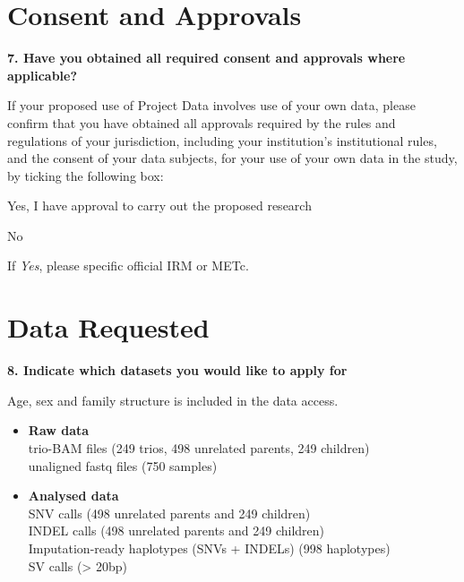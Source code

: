 \documentclass[a4paper,12pt]{article}
\begin{document}
\begin{Form}
\TextField[name=studyDescription,multiline=true,height=30\baselineskip]{}

\section*{Consent and Approvals}

\textbf{7. Have you obtained all required consent and approvals where applicable?}

If your proposed use of Project Data involves use of your own data, please confirm that you have obtained all approvals required by the rules and regulations of your jurisdiction, including your institution’s institutional rules, and the consent of your data subjects, for your use of your own data in the study, by ticking the following box:

 Yes, I have approval to carry out the proposed research

 No

If \emph{Yes}, please specific official IRM or METc.

\TextField[name=consentApproval,multiline=true,height=6\baselineskip]{}

\section*{Data Requested}

\textbf{8. Indicate which datasets you would like to apply for}

Age, sex and family structure is included in the data access.
\begin{itemize}
  \item[] \CheckBox[name=testYes]{\ignorespaces} \textbf{Raw data} \\
    \-\hspace{7mm}trio-BAM files (249 trios, 498 unrelated parents, 249 children) \\
    \-\hspace{7mm}unaligned fastq files (750 samples) \\
  \item[] \CheckBox[name=testNo]{\ignorespaces} \textbf{Analysed data} \\
    \-\hspace{7mm}SNV calls (498 unrelated parents and 249 children) \\
    \-\hspace{7mm}INDEL calls (498 unrelated parents and 249 children) \\
    \-\hspace{7mm}Imputation-ready haplotypes (SNVs + INDELs) (998 haplotypes) \\
    \-\hspace{7mm}SV calls (> 20bp) \\
\end{itemize}


\end{Form}
\end{document}
